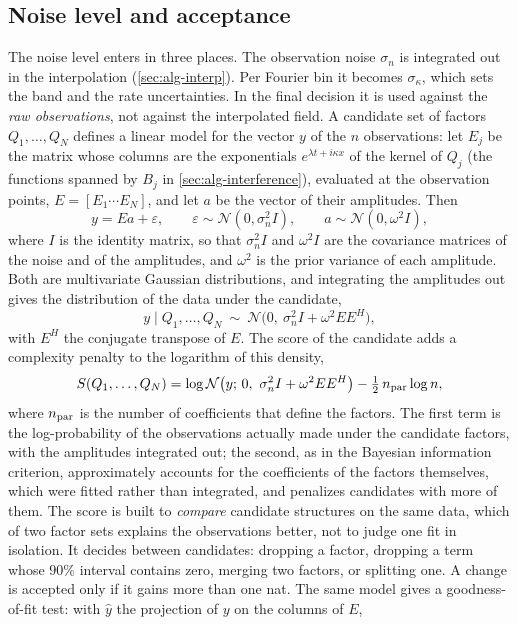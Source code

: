 \documentclass[11pt]{article}
\theoremstyle{plain}
\theoremstyle{definition}
\theoremstyle{remark}
\newcommand{\noise}{\sigma_{n}}             %
\newcommand{\sigbin}{\sigma_{\kappa}}       %
\newcommand{\Normal}{\mathcal{N}}
\begin{document}
\subsection{Noise level and acceptance}\label{sec:alg-accept}
The noise level enters in three places. The observation noise $\noise$ is integrated out in the
interpolation (\cref{sec:alg-interp}). Per Fourier bin it becomes $\sigbin$, which sets the band and the
rate uncertainties. In the final decision it is used against the \emph{raw observations}, not against the
interpolated field. A candidate set of factors $Q_1,\dots,Q_N$ defines a linear model for the vector $y$ of the $n$
observations: let $E_j$ be the matrix whose columns are the exponentials $e^{\lambda t+i\kappa x}$ of the kernel of $Q_j$
(the functions spanned by $B_j$ in \cref{sec:alg-interference}), evaluated at the observation points, $E=[E_1\cdots E_N]$,
and let $a$ be the vector of their amplitudes. Then
\[
  y=Ea+\varepsilon,\qquad \varepsilon\sim\Normal(0,\noise^2I),\qquad a\sim\Normal(0,\omega^2I),
\]
where $I$ is the identity matrix, so that $\noise^2I$ and $\omega^2I$ are the covariance matrices of the noise and of the
amplitudes, and $\omega^2$ is the prior variance of each amplitude. Both are multivariate Gaussian distributions, and
integrating the amplitudes out gives the distribution of the data under the candidate,
\[
  y\mid Q_1,\dots,Q_N\ \sim\ \Normal\big(0,\ \noise^2I+\omega^2EE^H\big),
\]
with $E^H$ the conjugate transpose of $E$. The score of the candidate adds a complexity penalty to the logarithm of
this density,
\begin{equation}\label{eq:raw-evidence}
  S(Q_1,\dots,Q_N)=\log\Normal\big(y;\,0,\ \noise^2I+\omega^2EE^H\big)-\tfrac12\,n_{\rm par}\log n ,
\end{equation}
where $n_{\rm par}$ is the number of coefficients that define the factors. The first term is the log-probability of
the observations actually made under the candidate factors, with the amplitudes integrated out; the second, as in the
Bayesian information criterion, approximately accounts for the coefficients of the factors themselves, which were fitted
rather than integrated, and penalizes candidates with more of them.
The score is built to \emph{compare} candidate structures on the same data, which of two factor sets explains the
observations better, not to judge one fit in isolation. It decides between candidates: dropping a factor, dropping a term whose $90\%$
interval contains zero, merging two factors, or splitting one. A change is accepted only if it gains more
than one nat. The same model gives a goodness-of-fit test: with $\hat y$ the projection of $y$ on the columns of $E$,
\end{document}

